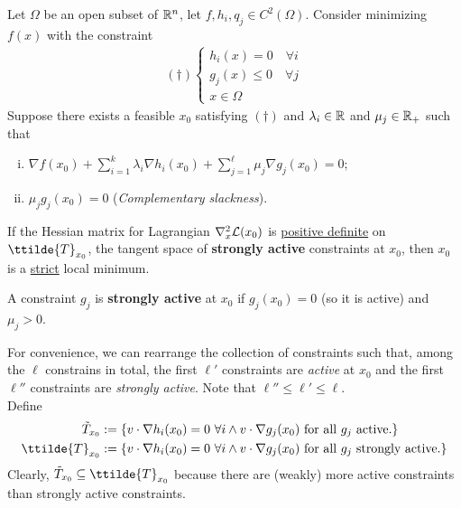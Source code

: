 \documentclass{article}
\begin{document}
	\begin{theorem}
		Let $\Omega$ be an open subset of $\mathbb{R}^n$, let $f, h_i, q_j \in C^2(\Omega)$. Consider minimizing $f(x)$ with the constraint
		\begin{align}
			(\dag ) \begin{cases}
				h_i(x) = 0\quad \forall i \\
				g_j(x) \leq 0\quad \forall j \\
				x \in \Omega
			\end{cases}
		\end{align}
		Suppose there exists a feasible $x_0$ satisfying $(\dag)$ and $\lambda_i \in \mathbb{R}$ and $\mu_j \in \mathbb{R}_{+}$ such that
   		\begin{enumerate}[(i)]
   			\item $\nabla f(x_0) + \sum_{i=1}^k \lambda_i \nabla h_i(x_0) + \sum_{j=1}^\ell \mu_j \nabla g_j(x_0) = 0$;
   			\item $\mu_j g_j(x_0) = 0$ (\emph{Complementary slackness}).
   		\end{enumerate}
   		If the Hessian matrix for Lagrangian $\nabla_x^2 \mathcal{{L}}(x_0)$ is \ul{positive definite} on $\ttilde{T}_{x_0}$, the tangent space of \textbf{strongly active} constraints at $x_0$, then $x_0$ is a \ul{strict} local minimum.
	\end{theorem}
	
	\begin{definition}
		A constraint $g_j$ is \textbf{strongly active} at $x_0$ if $g_j(x_0) = 0$ (so it is active) and $\mu_j > 0$. 
	\end{definition}
	
	\begin{notation}
		For convenience, we can rearrange the collection of constraints such that, among the $\ell$ constrains in total, the first $\ell'$ constraints are \emph{active} at $x_0$ and the first $\ell''$ constraints are \emph{strongly active}. Note that $\ell'' \leq \ell ' \leq \ell$. \\
		Define 
		\begin{align}
			\tilde{T}_{x_0} &:= \{
			v \cdot \nabla h_i(x_0) = 0\ \forall i \land v \cdot \nabla g_j(x_0)\tx{ for all $g_j$ active.}
			\} \\
			\ttilde{T}_{x_0} &:= \{
			v \cdot \nabla h_i(x_0) = 0\ \forall i \land v \cdot \nabla g_j(x_0) \tx{ for all $g_j$ strongly active.}
			\}
		\end{align}
		Clearly, $\tilde{T}_{x_0} \subseteq \ttilde{T}_{x_0}$ because there are (weakly) more active constraints than strongly active constraints.
	\end{notation}
	
\end{document}
